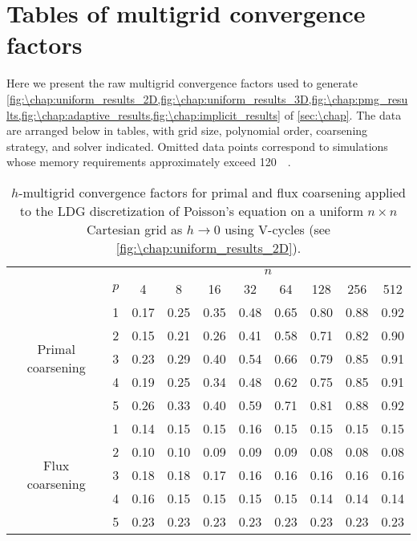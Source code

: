 
\chapter{Tables of multigrid convergence factors}\label{app:\chap}
Here we present the raw multigrid convergence factors used to generate \cref{fig:\chap:uniform_results_2D,fig:\chap:uniform_results_3D,fig:\chap:pmg_results,fig:\chap:adaptive_results,fig:\chap:implicit_results} of \cref{sec:\chap}. The data are arranged below in tables, with grid size, polynomial order, coarsening strategy, and solver indicated. Omitted data points correspond to simulations whose memory requirements approximately exceed \SI{120}{\giga\byte}.

\begin{table}[htb]
\caption{$h$-multigrid convergence factors for primal and flux coarsening applied to the LDG discretization of Poisson's equation on a uniform $n \times n$ Cartesian grid as ${h\to 0}$ using V-cycles (see \cref{fig:\chap:uniform_results_2D}).\vspace{-1.8em}}
\label{tab:2D_uniform_vcycles}
\centering
\small
\begin{tabular}{@{}cl@{\qquad}cccccccc@{}}
&&&&&&&&& \\ \midrule
&& \multicolumn{8}{c}{$n$} \\
& $p$ & 4 & 8 & 16 & 32 & 64 & 128 & 256 & 512 \\ \cmidrule{1-10}
\multirow{5}{*}{Primal coarsening}
& 1 & 0.17 & 0.25 & 0.35 & 0.48 & 0.65 & 0.80 & 0.88 & 0.92 \\ 
& 2 & 0.15 & 0.21 & 0.26 & 0.41 & 0.58 & 0.71 & 0.82 & 0.90 \\ 
& 3 & 0.23 & 0.29 & 0.40 & 0.54 & 0.66 & 0.79 & 0.85 & 0.91 \\ 
& 4 & 0.19 & 0.25 & 0.34 & 0.48 & 0.62 & 0.75 & 0.85 & 0.91 \\ 
& 5 & 0.26 & 0.33 & 0.40 & 0.59 & 0.71 & 0.81 & 0.88 & 0.92 \\ \cmidrule{1-10}
\multirow{5}{*}{Flux coarsening}
& 1 & 0.14 & 0.15 & 0.15 & 0.16 & 0.15 & 0.15 & 0.15 & 0.15 \\ 
& 2 & 0.10 & 0.10 & 0.09 & 0.09 & 0.09 & 0.08 & 0.08 & 0.08 \\ 
& 3 & 0.18 & 0.18 & 0.17 & 0.16 & 0.16 & 0.16 & 0.16 & 0.16 \\ 
& 4 & 0.16 & 0.15 & 0.15 & 0.15 & 0.15 & 0.14 & 0.14 & 0.14 \\ 
& 5 & 0.23 & 0.23 & 0.23 & 0.23 & 0.23 & 0.23 & 0.23 & 0.23 \\ \midrule
\end{tabular}
\end{table}

